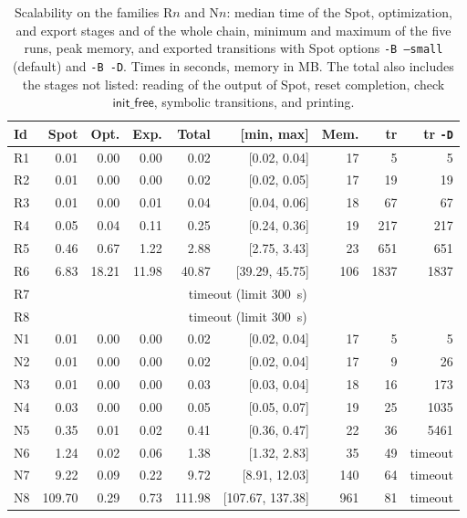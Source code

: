 \begin{table}[t]
\centering
\caption{Scalability on the families R$n$ and N$n$: median time of the Spot, optimization, and export stages and of the whole chain, minimum and maximum of the five runs, peak memory, and exported transitions with Spot options \texttt{-B --small} (default) and \texttt{-B -D}.  Times in seconds, memory in MB.  The total also includes the stages not listed: reading of the output of Spot, reset completion, check $\mathsf{init\_free}$, symbolic transitions, and printing.}
\label{tab:scaling}
\footnotesize
\setlength{\tabcolsep}{3pt}
\begin{tabular}{@{}lrrrrrrrr@{}}
\toprule
Id & Spot & Opt. & Exp. & Total & [min, max] & Mem. & tr & tr \texttt{-D}\\
\midrule
R1 & 0.01 & 0.00 & 0.00 & 0.02 & [0.02, 0.04] & 17 & 5 & 5\\
R2 & 0.01 & 0.00 & 0.00 & 0.02 & [0.02, 0.05] & 17 & 19 & 19\\
R3 & 0.01 & 0.00 & 0.01 & 0.04 & [0.04, 0.06] & 18 & 67 & 67\\
R4 & 0.05 & 0.04 & 0.11 & 0.25 & [0.24, 0.36] & 19 & 217 & 217\\
R5 & 0.46 & 0.67 & 1.22 & 2.88 & [2.75, 3.43] & 23 & 651 & 651\\
R6 & 6.83 & 18.21 & 11.98 & 40.87 & [39.29, 45.75] & 106 & 1837 & 1837\\
R7 & \multicolumn{8}{c}{timeout (limit 300~s)}\\
R8 & \multicolumn{8}{c}{timeout (limit 300~s)}\\
N1 & 0.01 & 0.00 & 0.00 & 0.02 & [0.02, 0.04] & 17 & 5 & 5\\
N2 & 0.01 & 0.00 & 0.00 & 0.02 & [0.02, 0.04] & 17 & 9 & 26\\
N3 & 0.01 & 0.00 & 0.00 & 0.03 & [0.03, 0.04] & 18 & 16 & 173\\
N4 & 0.03 & 0.00 & 0.00 & 0.05 & [0.05, 0.07] & 19 & 25 & 1035\\
N5 & 0.35 & 0.01 & 0.02 & 0.41 & [0.36, 0.47] & 22 & 36 & 5461\\
N6 & 1.24 & 0.02 & 0.06 & 1.38 & [1.32, 2.83] & 35 & 49 & timeout\\
N7 & 9.22 & 0.09 & 0.22 & 9.72 & [8.91, 12.03] & 140 & 64 & timeout\\
N8 & 109.70 & 0.29 & 0.73 & 111.98 & [107.67, 137.38] & 961 & 81 & timeout\\
\bottomrule
\end{tabular}
\end{table}
